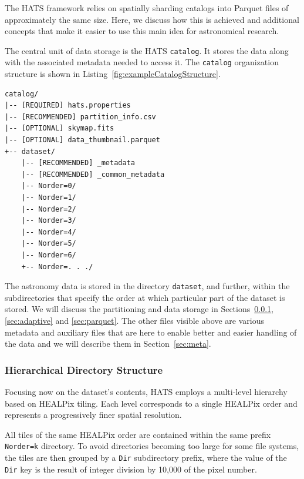 \documentclass[11pt,a4paper]{ivoa}
\begin{document}
The HATS framework relies on spatially sharding catalogs into Parquet files of approximately the same size. 
Here, we discuss how this is achieved and additional concepts that make it easier to use this main idea for astronomical research.

The central unit of data storage is the HATS \texttt{catalog}. 
It stores the data along with the associated metadata needed to access it. 
The  \texttt{catalog} organization structure is shown in Listing~\ref{fig:exampleCatalogStructure}.

\begin{minipage}{\linewidth}
\begin{lstlisting}[caption=Example catalog directory contents, label=fig:exampleCatalogStructure]
catalog/
|-- [REQUIRED] hats.properties
|-- [RECOMMENDED] partition_info.csv
|-- [OPTIONAL] skymap.fits
|-- [OPTIONAL] data_thumbnail.parquet
+-- dataset/
    |-- [RECOMMENDED] _metadata
    |-- [RECOMMENDED] _common_metadata
    |-- Norder=0/
    |-- Norder=1/
    |-- Norder=2/
    |-- Norder=3/
    |-- Norder=4/
    |-- Norder=5/
    |-- Norder=6/
    +-- Norder=. . ./
\end{lstlisting}
\end{minipage}

The astronomy data is stored in the directory \texttt{dataset}, and further, within the subdirectories that specify the order at which particular part of the dataset is stored. 
We will discuss the partitioning and data storage in Sections~\ref{sec:hierarchical}, \ref{sec:adaptive} and \ref{sec:parquet}. 
The other files visible above are various metadata and auxiliary files that are here to enable better and easier handling of the data and we will describe them in Section~\ref{sec:meta}. 
    
\subsubsection{Hierarchical Directory Structure} \label{sec:hierarchical}
Focusing now on the dataset's contents, HATS employs a multi-level hierarchy based on HEALPix tiling.
Each level corresponds to a single HEALPix order and represents a progressively finer spatial resolution.

All tiles of the same HEALPix order are contained within the same prefix \texttt{Norder=k} directory. 
To avoid directories becoming too large for some file systems, the tiles are then grouped by a \texttt{Dir} subdirectory prefix,
where the value of the \texttt{Dir} key is the result of integer division by 10,000 of the pixel number.
\end{document}
